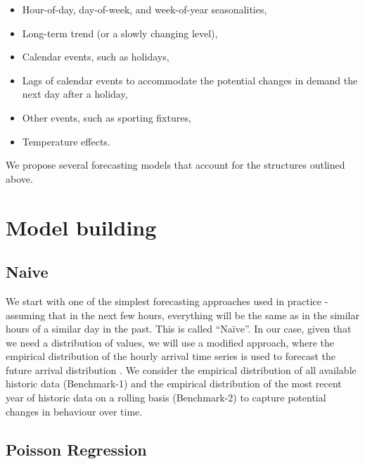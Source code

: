 \documentclass[]{elsarticle} %
\providecommand{\tightlist}{%
  \setlength{\itemsep}{0pt}\setlength{\parskip}{0pt}}
\begin{document}
\begin{itemize}
\tightlist
\item
  Hour-of-day, day-of-week, and week-of-year seasonalities,
\item
  Long-term trend (or a slowly changing level),
\item
  Calendar events, such as holidays,
\item
  Lags of calendar events to accommodate the potential changes in
  demand the next day after a holiday,
\item
  Other events, such as sporting fixtures,
\item
  Temperature effects.
\end{itemize}

We propose several forecasting models that account for the structures
outlined above.

\hypertarget{model}{%
\section{Model building}\label{model}}

\hypertarget{naive}{%
\subsection{Naive}\label{naive}}

We start with one of the simplest forecasting approaches used in
practice - assuming that in the next few hours, everything will be the
same as in the similar hours of a similar day in the past. This is
called ``Naïve''. In our case, given that we need a distribution of
values, we will use a modified approach, where the
empirical distribution of the hourly arrival time series is used to
forecast the future arrival distribution \citep{la2021new}. We consider the
empirical distribution of all available historic data (Benchmark-1) and
the empirical distribution of the most recent year of historic data on a
rolling basis (Benchmark-2) to capture potential changes in behaviour
over time.

\hypertarget{poisson-regression}{%
\subsection{Poisson Regression}\label{poisson-regression}}
\end{document}
